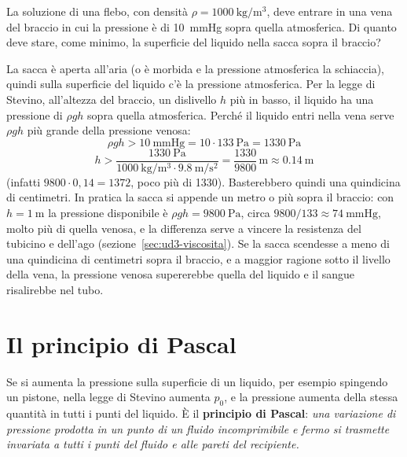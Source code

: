 \begin{esempio}
La soluzione di una flebo, con densità $\rho = \SI{1000}{\kilo\gram\per\metre\cubed}$, deve entrare in una vena del braccio in cui la pressione è di \SI{10}{\mmHg} sopra quella atmosferica. Di quanto deve stare, come minimo, la superficie del liquido nella sacca sopra il braccio?

La sacca è aperta all'aria (o è morbida e la pressione atmosferica la schiaccia), quindi sulla superficie del liquido c'è la pressione atmosferica. Per la legge di Stevino, all'altezza del braccio, un dislivello $h$ più in basso, il liquido ha una pressione di $\rho g h$ sopra quella atmosferica. Perché il liquido entri nella vena serve $\rho g h$ più grande della pressione venosa:
\[
  \rho g h > \SI{10}{\mmHg} = 10 \cdot \SI{133}{\pascal} = \SI{1330}{\pascal}
\]
\[
  h > \frac{\SI{1330}{\pascal}}{\SI{1000}{\kilo\gram\per\metre\cubed} \cdot \SI{9,8}{\metre\per\second\squared}} = \frac{1330}{9800}\,\si{\metre} \approx \SI{0,14}{\metre}
\]
(infatti $9800 \cdot 0{,}14 = 1372$, poco più di 1330). Basterebbero quindi una quindicina di centimetri. In pratica la sacca si appende un metro o più sopra il braccio: con $h = \SI{1}{\metre}$ la pressione disponibile è $\rho g h = \SI{9800}{\pascal}$, circa $9800/133 \approx \SI{74}{\mmHg}$, molto più di quella venosa, e la differenza serve a vincere la resistenza del tubicino e dell'ago (sezione~\ref{sec:ud3-viscosita}). Se la sacca scendesse a meno di una quindicina di centimetri sopra il braccio, e a maggior ragione sotto il livello della vena, la pressione venosa supererebbe quella del liquido e il sangue risalirebbe nel tubo.
\end{esempio}

\section{Il principio di Pascal}
\label{sec:ud3-pascal}

Se si aumenta la pressione sulla superficie di un liquido, per esempio spingendo un pistone, nella legge di Stevino aumenta $p_0$, e la pressione aumenta della stessa quantità in tutti i punti del liquido. È il \textbf{principio di Pascal}: \emph{una variazione di pressione prodotta in un punto di un fluido incomprimibile e fermo si trasmette invariata a tutti i punti del fluido e alle pareti del recipiente.}

